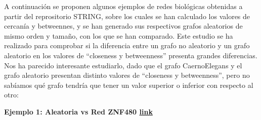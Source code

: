 \documentclass[11pt]{article}
\begin{document}
A continuación se proponen algunos ejemplos de redes biológicas
obtenidas a partir del reprositorio STRING, sobre los cuales se han
calculado los valores de cercanía y betweennes, y se han generado sus
respectivos grafos aleatorios de mismo orden y tamaño, con los que se
han comparado. Este estudio se ha realizado para comprobar si la
diferencia entre un grafo no aleatorio y un grafo aleatorio en los
valores de ``closeness y betweenness'' presenta grandes diferencias. Nos
ha parecido interesante estudiarlo, dado que el grafo CaernoElegans y el
grafo aleatorio presentan distinto valores de ``closeness y
betweenness'', pero no sabíamos qué grafo tendría que tener un valor
superior o inferior con respecto al otro:

\textbf{Ejemplo 1: Aleatoria vs Red ZNF480
\href{https://string-db.org/cgi/network.pl?taskId=cSfmw1qwj02H}{link}}
\end{document}
